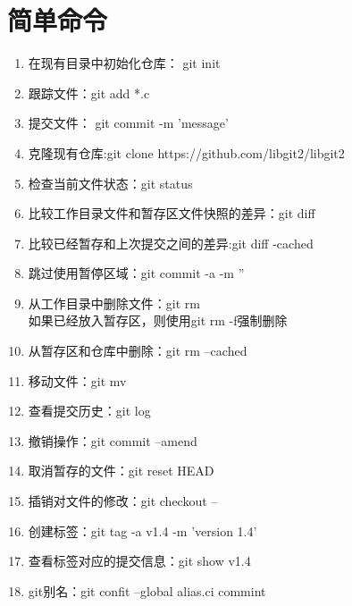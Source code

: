 \documentclass{article}
\begin{document}
	\section{简单命令}
	\begin{enumerate}
		\item 在现有目录中初始化仓库： git init
		
		\item 跟踪文件：git add *.c
		
		\item 提交文件： git commit -m 'message'
		
		\item 克隆现有仓库:git clone https://github.com/libgit2/libgit2
		
		\item 检查当前文件状态：git status
		
		\item 比较工作目录文件和暂存区文件快照的差异：git diff
		
		\item 比较已经暂存和上次提交之间的差异:git diff -cached
		
		\item 跳过使用暂停区域：git commit -a -m ''
		
		\item 从工作目录中删除文件：git rm\\
		如果已经放入暂存区，则使用git rm -f强制删除
		
		\item 从暂存区和仓库中删除：git rm --cached
		
		\item 移动文件：git mv
		
		\item 查看提交历史：git log
		
		\item 撤销操作：git commit --amend
		
		\item 取消暂存的文件：git reset  HEAD
		
		\item 插销对文件的修改：git checkout --
		
		\item 创建标签：git tag  -a v1.4 -m 'version 1.4'
		
		\item 查看标签对应的提交信息：git show v1.4
		
		\item git别名：git confit --global alias.ci commint
	\end{enumerate} 
\end{document}
